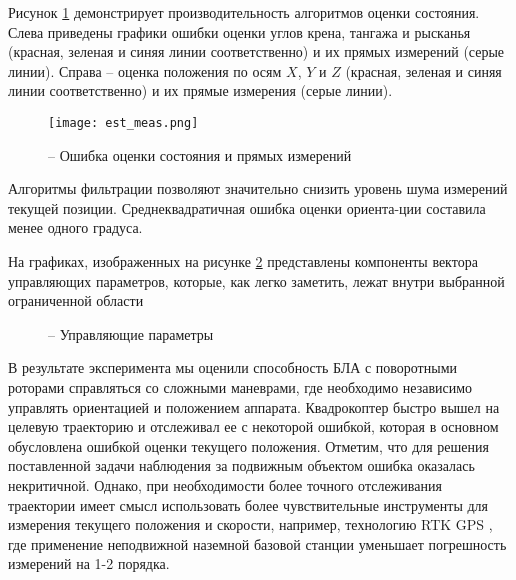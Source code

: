 Рисунок \ref{fig:mau_est} демонстрирует производительность алгоритмов оценки состояния. Слева приведены графики ошибки оценки углов крена, тангажа и рысканья (красная, зеленая и синяя линии соответственно) и их прямых измерений (серые линии). Справа – оценка положения по осям $X$, $Y$ и $Z$ (красная, зеленая и синяя линии соответственно) и их прямые измерения (серые линии).
\begin{figure}[h!]
	\centering
	\texttt{[image: est\_meas.png]}
	\caption{ -- Ошибка оценки состояния и прямых измерений}
	\label{fig:mau_est}
\end{figure}
Алгоритмы фильтрации позволяют значительно снизить уровень шума измерений текущей позиции. Среднеквадратичная ошибка оценки ориента-ции составила менее одного градуса.

На графиках, изображенных на рисунке \ref{fig:mau_ctrl_out} представлены компоненты вектора управляющих параметров, которые, как легко заметить, лежат внутри выбранной ограниченной области

\begin{figure}[h!]
	
	
	
	\caption{ -- Управляющие параметры}
	\label{fig:mau_ctrl_out}
	
\end{figure}

В результате эксперимента мы оценили способность БЛА с поворотными роторами справляться со сложными маневрами, где необходимо независимо управлять ориентацией и положением аппарата. Квадрокоптер быстро вышел на целевую траекторию и отслеживал ее с некоторой ошибкой, которая в основном обусловлена ошибкой оценки текущего положения.
Отметим, что для решения поставленной задачи наблюдения за подвижным объектом ошибка оказалась некритичной. 
Однако, при необходимости более точного отслеживания траектории имеет смысл использовать более чувствительные инструменты для измерения текущего положения и скорости, например, технологию RTK GPS \cite{Feng01}, где применение неподвижной наземной базовой станции уменьшает погрешность измерений на 1-2 порядка.